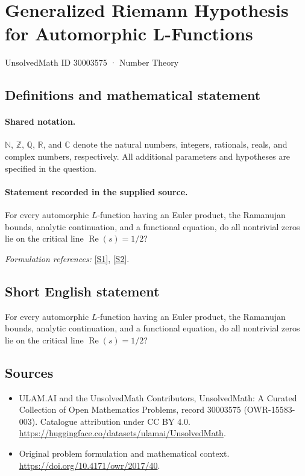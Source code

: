 \documentclass[11pt]{article}
\newcommand{\sref}[2]{\hyperlink{source:#1:#2}{[S#2]}}
\begin{document}
\setcounter{section}{30003574}
\section{Generalized Riemann Hypothesis for Automorphic L-Functions}\label{30003575}
{\small UnsolvedMath ID 30003575 · Number Theory}
\subsection{Definitions and mathematical statement}

\paragraph{Shared notation.}$\mathbb N$, $\mathbb Z$, $\mathbb Q$, $\mathbb R$, and $\mathbb C$ denote the natural numbers, integers, rationals, reals, and complex numbers, respectively. All additional parameters and hypotheses are specified in the question.


\paragraph{Statement recorded in the supplied source.}
For every automorphic $L$-function having an Euler product, the Ramanujan bounds, analytic continuation, and a functional equation, do all nontrivial zeros lie on the critical line $\operatorname{Re}(s)=1/2$?
\par\smallskip\textit{Formulation references:} \sref{30003575}{1}, \sref{30003575}{2}.
\subsection{Short English statement}
For every automorphic $L$-function having an Euler product, the Ramanujan bounds, analytic continuation, and a functional equation, do all nontrivial zeros lie on the critical line $\operatorname{Re}(s)=1/2$?
\subsection{Sources}
\begin{itemize}
\item[\hypertarget{source:30003575:1}{S1}] ULAM.AI and the UnsolvedMath Contributors, UnsolvedMath: A Curated Collection of Open Mathematics Problems, record 30003575 (OWR-15583-003). Catalogue attribution under CC BY 4.0.
\url{https://huggingface.co/datasets/ulamai/UnsolvedMath}.
\item[\hypertarget{source:30003575:2}{S2}] Original problem formulation and mathematical context.
\url{https://doi.org/10.4171/owr/2017/40}.
\end{itemize}
\label{end:30003575}
\end{document}
